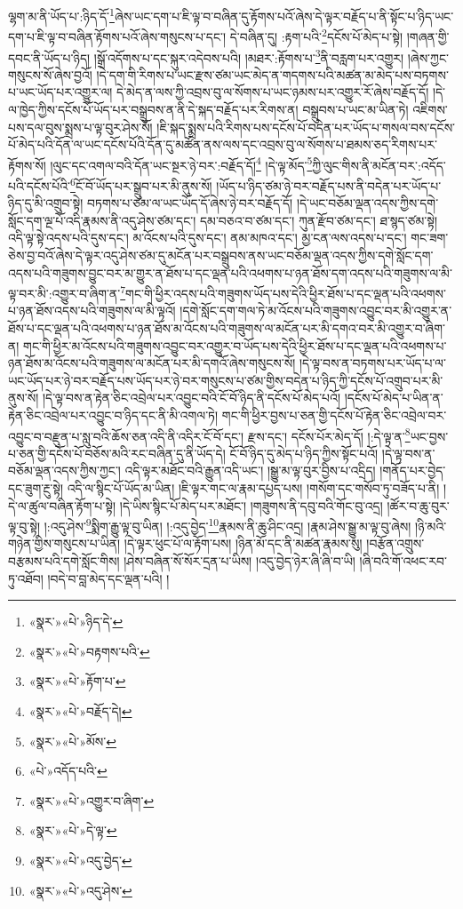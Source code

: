 ལྷག་མ་ནི་ཡོད་པ་:ཉིད་དོ་\footnote{«སྣར་»«པེ་»ཉིད་དེ་}ཞེས་ཡང་དག་པ་ཇི་ལྟ་བ་བཞིན་དུ་རྟོགས་པའོ་ཞེས་དེ་ལྟར་བརྗོད་པ་ནི་སྟོང་པ་ཉིད་ཡང་དག་པ་ཇི་ལྟ་བ་བཞིན་རྟོགས་པའོ་ཞེས་གསུངས་པ་དང་། དེ་བཞིན་དུ། :རྟག་པའི་\footnote{«སྣར་»«པེ་»བརྟགས་པའི་}དངོས་པོ་མེད་པ་སྟེ། །གཞན་གྱི་དབང་ནི་ཡོད་པ་ཉིད། །སྒྲོ་འདོགས་པ་དང་སྐུར་འདེབས་པའི། །མཐར་:རྟོགས་པ་\footnote{«སྣར་»«པེ་»རྟོག་པ་}ནི་བརླག་པར་འགྱུར། །ཞེས་ཀྱང་གསུངས་སོ་ཞེས་བྱའོ། །དེ་དག་གི་རིགས་པ་ཡང་རྫས་ཙམ་ཡང་མེད་ན་གདགས་པའི་མཚན་མ་མེད་པས་བཏགས་པ་ཡང་ཡོད་པར་འགྱུར་ལ། དེ་མེད་ན་ལས་ཀྱི་འབྲས་བུ་ལ་སོགས་པ་ཡང་ཉམས་པར་འགྱུར་རོ་ཞེས་བརྗོད་དོ། །དེ་ལ་ཁྱེད་ཀྱིས་དངོས་པོ་ཡོད་པར་བསྒྲུབས་ན་ནི་དེ་སྐད་བརྗོད་པར་རིགས་ན། བསྒྲུབས་པ་ཡང་མ་ཡིན་ཏེ། འཇིགས་པས་དལ་བུས་སྨྲས་པ་ལྟ་བུར་ཤེས་སོ། །ཇི་སྐད་སྨྲས་པའི་རིགས་པས་དངོས་པོ་བདེན་པར་ཡོད་པ་གསལ་བས་དངོས་པོ་མེད་པའི་དོན་ལ་ཡང་དངོས་པོའི་དོན་དུ་མཚོན་ནས་ལས་དང་འབྲས་བུ་ལ་སོགས་པ་ཐམས་ཅད་རིགས་པར་རྟོགས་སོ། །ལུང་དང་འགལ་བའི་དོན་ཡང་སྔར་ཉེ་བར་:བརྗོད་དོ།\footnote{«སྣར་»«པེ་»བརྗོད་དེ།} །དེ་ལྟ་མོད་\footnote{«སྣར་»«པེ་»མོས་}ཀྱི་ལུང་གིས་ནི་མངོན་བར་:འདོད་པའི་དངོས་པོའི་\footnote{«པེ་»འདོད་པའི་}ངོ་བོ་ཡོད་པར་སྒྲུབ་པར་མི་ནུས་སོ། །ཡོད་པ་ཉིད་ཙམ་ཉེ་བར་བརྗོད་པས་ནི་བདེན་པར་ཡོད་པ་ཉིད་དུ་མི་འགྲུབ་སྟེ། བཏགས་པ་ཙམ་ལ་ཡང་ཡོད་དོ་ཞེས་ཉེ་བར་བརྗོད་དོ། །དེ་ཡང་བཅོམ་ལྡན་འདས་ཀྱིས་དགེ་སློང་དག་ལྔ་པོ་འདི་རྣམས་ནི་འདུ་ཤེས་ཙམ་དང་། དམ་བཅའ་བ་ཙམ་དང་། ཀུན་རྫོབ་ཙམ་དང་། ཐ་སྙད་ཙམ་སྟེ། འདི་ལྟ་སྟེ་འདས་པའི་དུས་དང་། མ་འོངས་པའི་དུས་དང་། ནམ་མཁའ་དང་། མྱ་ངན་ལས་འདས་པ་དང་། གང་ཟག་ཅེས་བྱ་བའོ་ཞེས་དེ་ལྟར་འདུ་ཤེས་ཙམ་དུ་མངོན་པར་བསྒྲུབས་ནས་ཡང་བཅོམ་ལྡན་འདས་ཀྱིས་དགེ་སློང་དག་འདས་པའི་གཟུགས་བྱུང་བར་མ་གྱུར་ན་ཐོས་པ་དང་ལྡན་པའི་འཕགས་པ་ཉན་ཐོས་དག་འདས་པའི་གཟུགས་ལ་མི་ལྟ་བར་མི་:འགྱུར་བ་ཞིག་ན་\footnote{«སྣར་»«པེ་»འགྱུར་བ་ཞིག་}གང་གི་ཕྱིར་འདས་པའི་གཟུགས་ཡོད་པས་དེའི་ཕྱིར་ཐོས་པ་དང་ལྡན་པའི་འཕགས་པ་ཉན་ཐོས་འདས་པའི་གཟུགས་ལ་མི་ལྟའོ། །དགེ་སློང་དག་གལ་ཏེ་མ་འོངས་པའི་གཟུགས་འབྱུང་བར་མི་འགྱུར་ན་ཐོས་པ་དང་ལྡན་པའི་འཕགས་པ་ཉན་ཐོས་མ་འོངས་པའི་གཟུགས་ལ་མངོན་པར་མི་དགའ་བར་མི་འགྱུར་བ་ཞིག་ན། གང་གི་ཕྱིར་མ་འོངས་པའི་གཟུགས་འབྱུང་བར་འགྱུར་བ་ཡོད་པས་དེའི་ཕྱིར་ཐོས་པ་དང་ལྡན་པའི་འཕགས་པ་ཉན་ཐོས་མ་འོངས་པའི་གཟུགས་ལ་མངོན་པར་མི་དགའོ་ཞེས་གསུངས་སོ། །དེ་ལྟ་བས་ན་བཏགས་པར་ཡོད་པ་ལ་ཡང་ཡོད་པར་ཉེ་བར་བརྗོད་པས་ཡོད་པར་ཉེ་བར་གསུངས་པ་ཙམ་གྱིས་བདེན་པ་ཉིད་ཀྱི་དངོས་པོ་འགྲུབ་པར་མི་ནུས་སོ། །དེ་ལྟ་བས་ན་རྟེན་ཅིང་འབྲེལ་པར་འབྱུང་བའི་ངོ་བོ་ཉིད་ནི་དངོས་པོ་མེད་པའོ། །དངོས་པོ་མེད་པ་ཡིན་ན་རྟེན་ཅིང་འབྲེལ་པར་འབྱུང་བ་ཉིད་དང་ནི་མི་འགལ་ཏེ། གང་གི་ཕྱིར་བྱས་པ་ཅན་གྱི་དངོས་པོ་རྟེན་ཅིང་འབྲེལ་བར་འབྱུང་བ་བརྫུན་པ་སླུ་བའི་ཆོས་ཅན་འདི་ནི་འདིར་ངོ་བོ་དང་། རྫས་དང་། དངོས་པོར་མེད་དོ། །:དེ་ལྟ་ན་\footnote{«སྣར་»«པེ་»དེ་ལྟ་}ཡང་བྱས་པ་ཅན་གྱི་དངོས་པོ་བཅོས་མའི་རང་བཞིན་དུ་ནི་ཡོད་དེ། ངོ་བོ་ཉིད་དུ་མེད་པ་ཉིད་ཀྱིས་སྟོང་པའོ། །དེ་ལྟ་བས་ན་བཅོམ་ལྡན་འདས་ཀྱིས་ཀྱང་། འདི་ལྟར་མཐོང་བའི་རྒྱུན་འདི་ཡང་། །སྒྱུ་མ་ལྟ་བུར་བྱིས་པ་འདྲིད། །གནོད་པར་བྱེད་དང་ཟུག་རྔུ་སྟེ། འདི་ལ་སྙིང་པོ་ཡོད་མ་ཡིན། །ཇི་ལྟར་གང་ལ་རྣམ་དཔྱད་པས། །གསོག་དང་གསོབ་ཏུ་བཟོད་པ་ནི། །དེ་ལ་ཚུལ་བཞིན་རྟོག་པ་སྟེ། །དེ་ཡིས་སྙིང་པོ་མེད་པར་མཐོང་། །གཟུགས་ནི་དབུ་བའི་གོང་བུ་འདྲ། །ཚོར་བ་ཆུ་བུར་ལྟ་བུ་སྟེ། །:འདུ་ཤེས་\footnote{«སྣར་»«པེ་»འདུ་བྱེད་}སྨིག་རྒྱུ་ལྟ་བུ་ཡིན། །:འདུ་བྱེད་\footnote{«སྣར་»«པེ་»འདུ་ཤེས་}རྣམས་ནི་ཆུ་ཤིང་འདྲ། །རྣམ་ཤེས་སྒྱུ་མ་ལྟ་བུ་ཞེས། །ཉི་མའི་གཉེན་གྱིས་གསུངས་པ་ཡིན། །དེ་ལྟར་ཕུང་པོ་ལ་རྟོག་པས། །ཉིན་མོ་དང་ནི་མཚན་རྣམས་སུ། །བརྩོན་འགྲུས་བརྩམས་པའི་དགེ་སློང་གིས། །ཤེས་བཞིན་སོ་སོར་དྲན་པ་ཡིས། །འདུ་བྱེད་ཉེར་ཞི་ཞི་བ་ཡི། །ཞི་བའི་གོ་འཕང་རབ་ཏུ་འཐོབ། །བདེ་བ་བླ་མེད་དང་ལྡན་པའི། །
